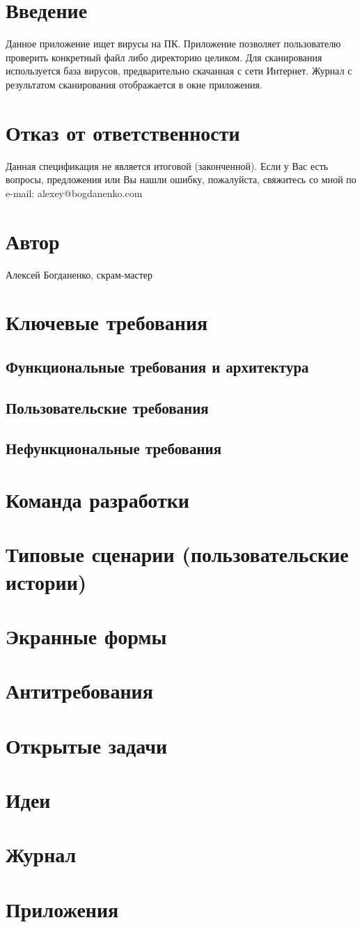 \section{Введение}
Данное приложение ищет вирусы на ПК. Приложение позволяет пользователю проверить конкретный файл либо директорию целиком. Для сканирования используется база вирусов, предварительно скачанная с сети Интернет. Журнал с результатом сканирования отображается в окне приложения.
\section{Отказ от ответственности}
Данная спецификация не является итоговой (законченной). Если у Вас есть вопросы, предложения или Вы нашли ошибку, пожалуйста, свяжитесь со мной по e-mail: alexey@bogdanenko.com
\section{Автор}
Алексей Богданенко, скрам-мастер
\section{Ключевые требования}
\subsection{Функциональные требования и архитектура}
\subsection{Пользовательские требования}
\subsection{Нефункциональные требования}
\section{Команда разработки}
\section{Типовые сценарии (пользовательские истории)}
\section{Экранные формы}
\section{Антитребования}
\section{Открытые задачи}
\section{Идеи}
\section{Журнал}
\section{Приложения}
